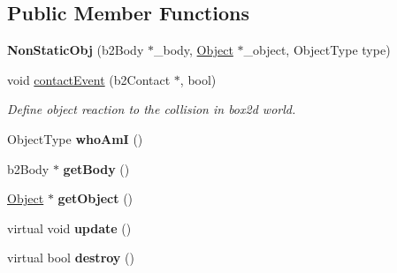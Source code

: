 \subsection*{Public Member Functions}
\begin{DoxyCompactItemize}
\item 
\mbox{\label{class_non_static_obj_a0295a381b988a0d0ab17eb3dcc229704}} 
{\bfseries Non\+Static\+Obj} (b2\+Body $\ast$\+\_\+body, \hyperlink{class_object}{Object} $\ast$\+\_\+object, Object\+Type type)
\item 
void \hyperlink{class_non_static_obj_ae129119384cf9df2b7b1a7849b6112de}{contact\+Event} (b2\+Contact $\ast$, bool)
\begin{DoxyCompactList}\small\item\em Define object reaction to the collision in box2d world. \end{DoxyCompactList}\item 
\mbox{\label{class_non_static_obj_a01e6db05d41ec62cb5c258b5069b083e}} 
Object\+Type {\bfseries who\+AmI} ()
\item 
\mbox{\label{class_non_static_obj_a55713a3f848d7629176398333e84a015}} 
b2\+Body $\ast$ {\bfseries get\+Body} ()
\item 
\mbox{\label{class_non_static_obj_abdf0a375a987d99795bd298a1c84940c}} 
\hyperlink{class_object}{Object} $\ast$ {\bfseries get\+Object} ()
\item 
\mbox{\label{class_non_static_obj_a6a67af264af5093665ca91273c9c6f34}} 
virtual void {\bfseries update} ()
\item 
\mbox{\label{class_non_static_obj_a197ed3470e1a7b4f10b1e5567fdc5253}} 
virtual bool {\bfseries destroy} ()
\end{DoxyCompactItemize}
